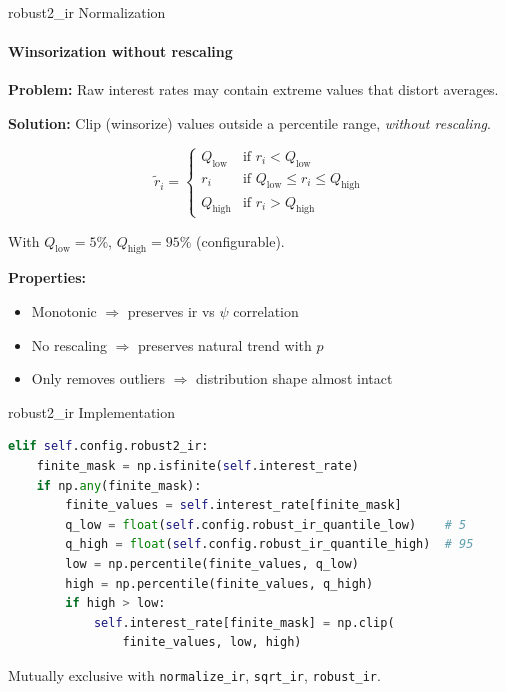 \documentclass[11pt]{beamer}
\begin{document}
\begin{frame}{robust2\_ir Normalization}
\framesubtitle{Winsorization without rescaling}

\noindent\textbf{Problem:} Raw interest rates may contain extreme values
that distort averages.

\vspace{0.5em}
\noindent\textbf{Solution:} Clip (winsorize) values outside a percentile range,
\emph{without rescaling}.

\vspace{0.5em}
\[
\tilde{r}_i =
\begin{cases}
Q_{\text{low}}  & \text{if } r_i < Q_{\text{low}} \\
r_i             & \text{if } Q_{\text{low}} \leq r_i \leq Q_{\text{high}} \\
Q_{\text{high}} & \text{if } r_i > Q_{\text{high}}
\end{cases}
\]

\vspace{0.5em}
\noindent With $Q_{\text{low}} = 5\%$, $Q_{\text{high}} = 95\%$ (configurable).

\medskip
\noindent\textbf{Properties:}
\begin{itemize}
    \item Monotonic $\Rightarrow$ preserves ir vs $\psi$ correlation
    \item No rescaling $\Rightarrow$ preserves natural trend with $p$
    \item Only removes outliers $\Rightarrow$ distribution shape almost intact
\end{itemize}
\end{frame}

\begin{frame}[fragile]{robust2\_ir Implementation}
\small
\begin{lstlisting}[language=Python]
elif self.config.robust2_ir:
    finite_mask = np.isfinite(self.interest_rate)
    if np.any(finite_mask):
        finite_values = self.interest_rate[finite_mask]
        q_low = float(self.config.robust_ir_quantile_low)    # 5
        q_high = float(self.config.robust_ir_quantile_high)  # 95
        low = np.percentile(finite_values, q_low)
        high = np.percentile(finite_values, q_high)
        if high > low:
            self.interest_rate[finite_mask] = np.clip(
                finite_values, low, high)
\end{lstlisting}

\vspace{0.3em}
\noindent Mutually exclusive with \texttt{normalize\_ir}, \texttt{sqrt\_ir}, \texttt{robust\_ir}.
\end{frame}
\end{document}
